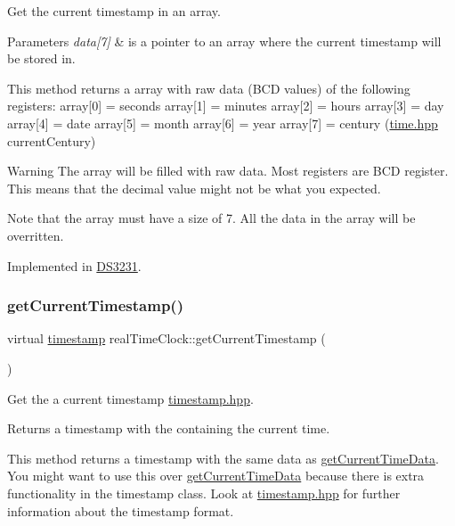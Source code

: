 Get the current timestamp in an array. 


\begin{DoxyParams}{Parameters}
{\em data\mbox{[}7\mbox{]}} & is a pointer to an array where the current timestamp will be stored in.\\
\hline
\end{DoxyParams}
This method returns a array with raw data (B\+CD values) of the following registers\+: array\mbox{[}0\mbox{]} = seconds array\mbox{[}1\mbox{]} = minutes array\mbox{[}2\mbox{]} = hours array\mbox{[}3\mbox{]} = day array\mbox{[}4\mbox{]} = date array\mbox{[}5\mbox{]} = month array\mbox{[}6\mbox{]} = year array\mbox{[}7\mbox{]} = century (\mbox{\hyperlink{time_8hpp_source}{time.\+hpp}} current\+Century) \begin{DoxyWarning}{Warning}
The array will be filled with raw data. Most registers are B\+CD register. This means that the decimal value might not be what you expected. 

Note that the array must have a size of 7. All the data in the array will be overritten. 
\end{DoxyWarning}


Implemented in \mbox{\hyperlink{class_d_s3231_a0ca41c2242367c5ff1424d1b12f909c5}{D\+S3231}}.

\mbox{\label{classreal_time_clock_a08a7854ef9cef638996a267a953c9b14}} 
\subsubsection{\texorpdfstring{get\+Current\+Timestamp()}{getCurrentTimestamp()}\hspace{0.1cm}{\footnotesize\ttfamily [1/2]}}
{\footnotesize\ttfamily virtual \mbox{\hyperlink{classtimestamp}{timestamp}} real\+Time\+Clock\+::get\+Current\+Timestamp (\begin{DoxyParamCaption}{ }\end{DoxyParamCaption})\hspace{0.3cm}{\ttfamily [pure virtual]}}



Get the a current timestamp \mbox{\hyperlink{timestamp_8hpp_source}{timestamp.\+hpp}}. 

\begin{DoxyReturn}{Returns}
a timestamp with the containing the current time.
\end{DoxyReturn}
This method returns a timestamp with the same data as \mbox{\hyperlink{classreal_time_clock_a2d1613b3cd572f62bc9faaea6a0f82f2}{get\+Current\+Time\+Data}}. You might want to use this over \mbox{\hyperlink{classreal_time_clock_a2d1613b3cd572f62bc9faaea6a0f82f2}{get\+Current\+Time\+Data}} because there is extra functionality in the timestamp class. Look at \mbox{\hyperlink{timestamp_8hpp_source}{timestamp.\+hpp}} for further information about the timestamp format. 

